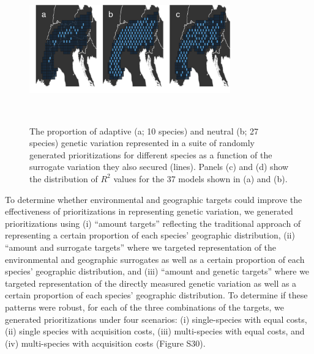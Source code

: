 \documentclass[9pt,twocolumn,twoside,lineno]{pnas-new}
\begin{document}
\begin{figure}

{\centering \includegraphics[width=3.42in,height=2.5in]{article_files/figure-latex/unnamed-chunk-3-1.pdf} 

}

\caption{The proportion of adaptive (a; 10 species) and neutral (b; 27 species) genetic variation represented in a suite of randomly generated prioritizations for different species as a function of the surrogate variation they also secured (lines). Panels (c) and (d) show the distribution of $R^2$ values for the 37 models shown in (a) and (b).}\label{fig:unnamed-chunk-3}
\end{figure}

To determine whether environmental and geographic targets could improve
the effectiveness of prioritizations in representing genetic variation,
we generated prioritizations using (i) ``amount targets'' reflecting the
traditional approach of representing a certain proportion of each
species' geographic distribution, (ii) ``amount and surrogate targets''
where we targeted representation of the environmental and geographic
surrogates as well as a certain proportion of each species' geographic
distribution, and (iii) ``amount and genetic targets'' where we targeted
representation of the directly measured genetic variation as well as a
certain proportion of each species' geographic distribution. To
determine if these patterns were robust, for each of the three
combinations of the targets, we generated prioritizations under four
scenarios: (i) single-species with equal costs, (ii) single species with
acquisition costs, (iii) multi-species with equal costs, and (iv)
multi-species with acquisition costs (Figure S30).
\end{document}
